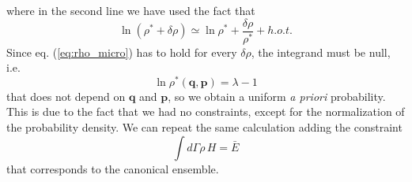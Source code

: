 where in the second line we have used the fact that 
\begin{equation}
    \ln(\rho^*+\delta\rho) \simeq \ln{\rho^*} + \frac{\delta\rho}{\rho^*} + h.o.t.
\end{equation}
Since eq. (\ref{eq:rho_micro}) has to hold for every $\delta\rho$, the integrand must be null, i.e.
\begin{equation}
    \ln{\rho^*}(\mathbf{q},\mathbf{p}) = \lambda-1
\end{equation}
that does not depend on $\mathbf{q}$ and $\mathbf{p}$, so we obtain a uniform \textit{a priori} probability. This is due to the fact that we had no constraints, except for the normalization of the probability density. We can repeat the same calculation adding the constraint 
\begin{equation}
    \int d\Gamma \rho\,H = \bar{E}
\end{equation}
that corresponds to the canonical ensemble.



